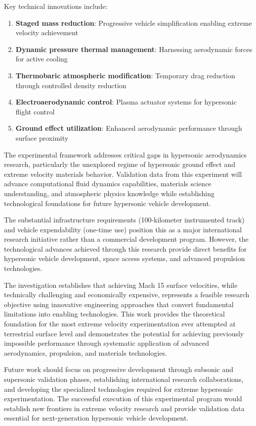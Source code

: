 \documentclass[12pt,a4paper]{article}
\begin{document}
Key technical innovations include:

\begin{enumerate}
\item \textbf{Staged mass reduction}: Progressive vehicle simplification enabling extreme velocity achievement
\item \textbf{Dynamic pressure thermal management}: Harnessing aerodynamic forces for active cooling
\item \textbf{Thermobaric atmospheric modification}: Temporary drag reduction through controlled density reduction
\item \textbf{Electroaerodynamic control}: Plasma actuator systems for hypersonic flight control
\item \textbf{Ground effect utilization}: Enhanced aerodynamic performance through surface proximity
\end{enumerate}

The experimental framework addresses critical gaps in hypersonic aerodynamics research, particularly the unexplored regime of hypersonic ground effect and extreme velocity materials behavior. Validation data from this experiment will advance computational fluid dynamics capabilities, materials science understanding, and atmospheric physics knowledge while establishing technological foundations for future hypersonic vehicle development.

The substantial infrastructure requirements (100-kilometer instrumented track) and vehicle expendability (one-time use) position this as a major international research initiative rather than a commercial development program. However, the technological advances achieved through this research provide direct benefits for hypersonic vehicle development, space access systems, and advanced propulsion technologies.

The investigation establishes that achieving Mach 15 surface velocities, while technically challenging and economically expensive, represents a feasible research objective using innovative engineering approaches that convert fundamental limitations into enabling technologies. This work provides the theoretical foundation for the most extreme velocity experimentation ever attempted at terrestrial surface level and demonstrates the potential for achieving previously impossible performance through systematic application of advanced aerodynamics, propulsion, and materials technologies.

Future work should focus on progressive development through subsonic and supersonic validation phases, establishing international research collaborations, and developing the specialized technologies required for extreme hypersonic experimentation. The successful execution of this experimental program would establish new frontiers in extreme velocity research and provide validation data essential for next-generation hypersonic vehicle development.
\end{document}
